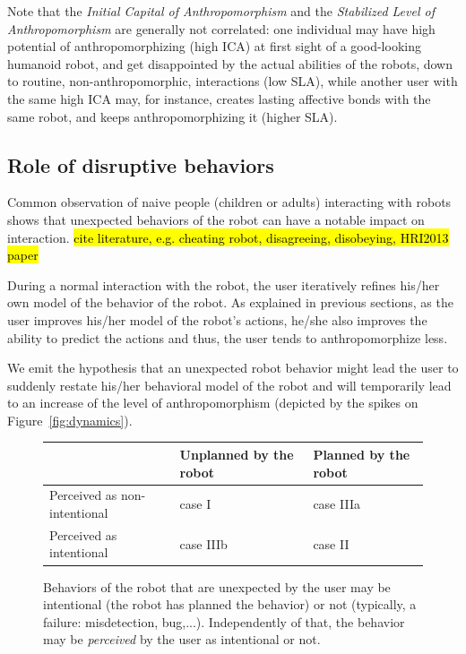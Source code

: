 \documentclass{frontiersSCNS} %
\begin{document}
Note that the \emph{Initial Capital of Anthropomorphism} and the
\emph{Stabilized Level of Anthropomorphism} are generally not correlated: one
individual may have high potential of anthropomorphizing (high ICA) at first
sight of a good-looking humanoid robot, and get disappointed by the actual
abilities of the robots, down to routine, non-anthropomorphic, interactions (low
SLA), while another user with the same high ICA may, for instance, creates
lasting affective bonds with the same robot, and keeps anthropomorphizing it
(higher SLA).


\subsection{Role of disruptive behaviors}
\label{sec:disruptive}

Common observation of naive people (children or adults) interacting with robots
shows that unexpected behaviors of the robot can have a notable impact on
interaction. \hl{cite literature, e.g. cheating robot, disagreeing, disobeying,
HRI2013 paper}

During a normal interaction with the robot, the user iteratively refines his/her
own model of the behavior of the robot. As explained in previous sections, as
the user improves his/her model of the robot's actions, he/she also improves the
ability to predict the actions and thus, the user tends to anthropomorphize
less.

We emit the hypothesis that an unexpected robot behavior might lead the user to
suddenly restate his/her behavioral model of the robot and will temporarily lead
to an increase of the level of anthropomorphism (depicted by the spikes on
Figure~\ref{fig:dynamics}).



\begin{figure}\footnotesize
    \centering
    \begin{tabular}{  >{\centering\arraybackslash}m{2cm} | >{\centering\arraybackslash}m{2cm} | >{\centering\arraybackslash}m{2cm} }
     & Unplanned by the robot & Planned by the robot \\ \hline
    Perceived as non-intentional & case I  & case IIIa  \\ \hline
    Perceived as intentional &  case IIIb & case II 
    \end{tabular}
\caption{
    Behaviors of the robot that are unexpected by the user may be intentional
    (the robot has planned the behavior) or not (typically, a failure:
    misdetection, bug,...). Independently of that, the behavior may be
    \emph{perceived} by the user as intentional or not.}
\label{fig:perceptionUnexpectedBehavior}
\end{figure}
\end{document}
